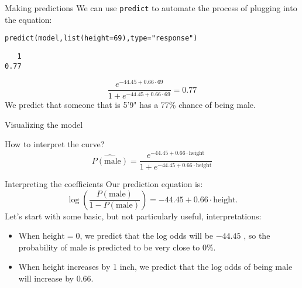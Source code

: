 \documentclass{beamer}\usepackage[]{graphicx}\usepackage[]{color}
\makeatletter
\newcommand{\hlnum}[1]{\textcolor[rgb]{0.824,0.412,0.118}{#1}}%
\newcommand{\hlstr}[1]{\textcolor[rgb]{1,0.894,0.71}{#1}}%
\newcommand{\hlstd}[1]{\textcolor[rgb]{1,0.894,0.769}{#1}}%
\newcommand{\hlkwc}[1]{\textcolor[rgb]{0.78,0.941,0.545}{#1}}%
\newcommand{\hlkwd}[1]{\textcolor[rgb]{1,0.78,0.769}{#1}}%
\newenvironment{kframe}{%
 \def\at@end@of@kframe{}%
 \ifinner\ifhmode%
  \def\at@end@of@kframe{\end{minipage}}%
  \begin{minipage}{\columnwidth}%
 \fi\fi%
 \def\FrameCommand##1{\hskip\@totalleftmargin \hskip-\fboxsep
 \colorbox{shadecolor}{##1}\hskip-\fboxsep
     \hskip-\linewidth \hskip-\@totalleftmargin \hskip\columnwidth}%
 \MakeFramed {\advance\hsize-\width
   \@totalleftmargin\z@ \linewidth\hsize
   \@setminipage}}%
 {\par\unskip\endMakeFramed%
 \at@end@of@kframe}
\newenvironment{knitrout}{}{} %
\makeatother
\begin{document}
\begin{darkframes}
    \begin{frame}[fragile]{Making predictions}
      We can use \texttt{predict} to automate the process of plugging into the equation:
\begin{knitrout}
\begin{kframe}
\begin{alltt}
\hlkwd{predict}\hlstd{(model,} \hlkwd{list}\hlstd{(}\hlkwc{height}\hlstd{=}\hlnum{69}\hlstd{),} \hlkwc{type}\hlstd{=}\hlstr{"response"}\hlstd{)}
\end{alltt}
\begin{verbatim}
   1 
0.77 
\end{verbatim}
\end{kframe}
\end{knitrout}
      
      \[
        \frac{e^{-44.45 + 0.66\cdot 69}}{1 + e^{-44.45 + 0.66\cdot 69}} = 0.77
      \]
      \pause
      We predict that someone that is 5'9" has a 77\% chance of being male.
    \end{frame}

    \begin{frame}[fragile]{Visualizing the model}
\begin{knitrout}


\end{knitrout}
    \end{frame}

    \begin{frame}[fragile]{How to interpret the curve?}
      \[
        \widehat{P(\text{male})} = \frac{e^{-44.45 + 0.66\cdot\text{height}}}{1 + e^{-44.45 + 0.66\cdot\text{height}}}
      \]
\begin{knitrout}


\end{knitrout}
    \end{frame}

    \begin{frame}{Interpreting the coefficients}
      Our prediction equation is:
      \[
        \log\left(\frac{P(\text{male})}{1-P(\text{male})}\right) = -44.45 + 0.66\cdot\text{height}.
      \]
      Let's start with some basic, but not particularly useful, interpretations:
      \begin{itemize}[<+->]
        \item When $\text{height}=0$, we predict that the log odds will be $-44.45$ \pause, so the probability of male is predicted to be very close to 0\%.
        \item When height increases by 1 inch, we predict that the log odds of being male will increase by $0.66$.
      \end{itemize}
    \end{frame}


\end{darkframes}
\end{document}
